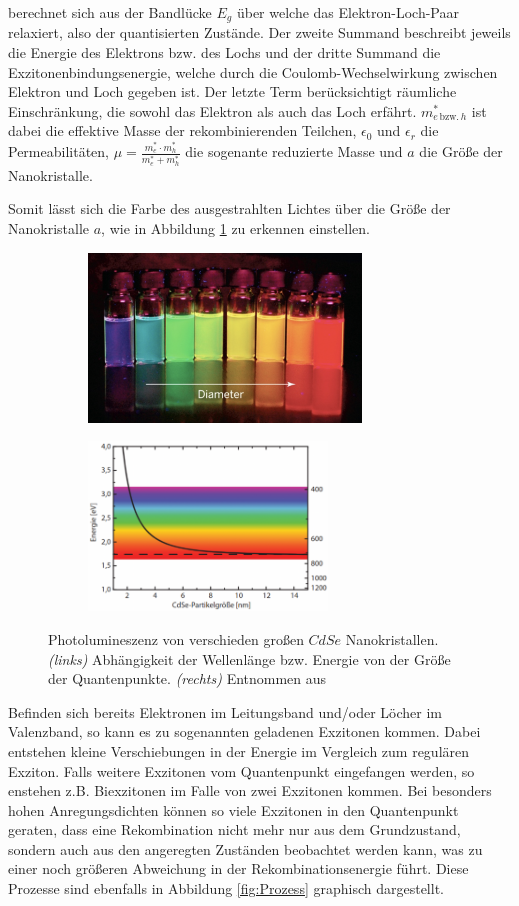       berechnet sich aus der Bandlücke $E_g$ über welche das Elektron-Loch-Paar relaxiert, also der quantisierten Zustände. Der zweite Summand beschreibt jeweils die Energie des Elektrons bzw. des Lochs und der dritte Summand die Exzitonenbindungsenergie, welche durch die Coulomb-Wechselwirkung zwischen Elektron und Loch gegeben ist. Der letzte Term berücksichtigt räumliche Einschränkung, die sowohl das Elektron als auch das Loch erfährt.
      $m_{e\,\text{bzw.}\,h}^*$ ist dabei die effektive Masse der rekombinierenden Teilchen, $\epsilon_0$ und $\epsilon_r$ die Permeabilitäten, $\mu=\frac{m_e^*\cdot m_h^*}{m_e^* + m_h^*}$ die sogenante reduzierte Masse und $a$ die Größe der Nanokristalle.

      Somit lässt sich die Farbe des ausgestrahlten Lichtes über die Größe der Nanokristalle $a$, wie in Abbildung \ref{fig:Farbe} zu erkennen einstellen.
      \begin{figure}[h]
        \begin{subfigure}{0.48\textwidth}
          \centering
          \includegraphics[height=4.5cm]{pictures/Farbe.png}
        \end{subfigure}
        \hfill
        \begin{subfigure}{0.48\textwidth}
          \centering
          \includegraphics[height=4.5cm]{pictures/Farbe2.png}
        \end{subfigure}
        \caption{Photolumineszenz von verschieden großen $CdSe$ Nanokristallen. \textit{(links)} Abhängigkeit der Wellenlänge bzw. Energie von der Größe der Quantenpunkte. \textit{(rechts)} Entnommen aus }
        \label{fig:Farbe}
      \end{figure}
      Befinden sich bereits Elektronen im Leitungsband und/oder Löcher im Valenzband, so kann es zu sogenannten geladenen Exzitonen kommen. Dabei entstehen kleine Verschiebungen in der Energie im Vergleich zum regulären Exziton.
      Falls weitere Exzitonen vom Quantenpunkt eingefangen werden, so enstehen z.B. Biexzitonen im Falle von zwei Exzitonen kommen. Bei besonders hohen Anregungsdichten können so viele Exzitonen in den Quantenpunkt geraten, dass eine Rekombination nicht mehr nur aus dem Grundzustand, sondern auch aus den angeregten Zuständen beobachtet werden kann, was zu einer noch größeren Abweichung in der Rekombinationsenergie führt. Diese Prozesse sind ebenfalls in Abbildung \ref{fig:Prozess} graphisch dargestellt.